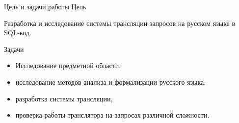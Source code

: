 \begin{frame}{Цель и задачи работы}%
  \Large
  Цель
  \normalsize

  Разработка и исследование системы трансляции запросов на русском языке в SQL-код.

  \Large
  Задачи
  \normalsize

  \begin{itemize}%
    \item Исследование предметной области,
    \item исследование методов анализа и формализации русского языка,
    \item разработка системы трансляции,
    \item проверка работы транслятора на запросах различной сложности.
  \end{itemize}
\end{frame}

